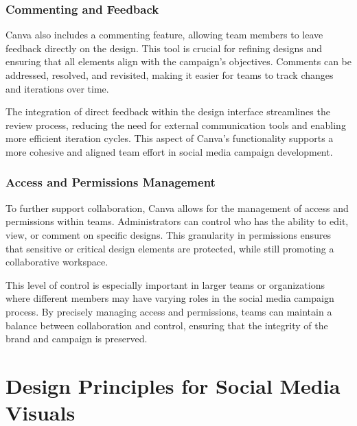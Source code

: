 \documentclass[
]{book}
\begin{document}
\hypertarget{commenting-and-feedback}{%
\subsubsection*{Commenting and Feedback}\label{commenting-and-feedback}}

Canva also includes a commenting feature, allowing team members to leave feedback directly on the design. This tool is crucial for refining designs and ensuring that all elements align with the campaign's objectives. Comments can be addressed, resolved, and revisited, making it easier for teams to track changes and iterations over time.

The integration of direct feedback within the design interface streamlines the review process, reducing the need for external communication tools and enabling more efficient iteration cycles. This aspect of Canva's functionality supports a more cohesive and aligned team effort in social media campaign development.

\hypertarget{access-and-permissions-management}{%
\subsubsection*{Access and Permissions Management}\label{access-and-permissions-management}}

To further support collaboration, Canva allows for the management of access and permissions within teams. Administrators can control who has the ability to edit, view, or comment on specific designs. This granularity in permissions ensures that sensitive or critical design elements are protected, while still promoting a collaborative workspace.

This level of control is especially important in larger teams or organizations where different members may have varying roles in the social media campaign process. By precisely managing access and permissions, teams can maintain a balance between collaboration and control, ensuring that the integrity of the brand and campaign is preserved.

\hypertarget{design-principles-for-social-media-visuals}{%
\section{Design Principles for Social Media Visuals}\label{design-principles-for-social-media-visuals}}
\end{document}
